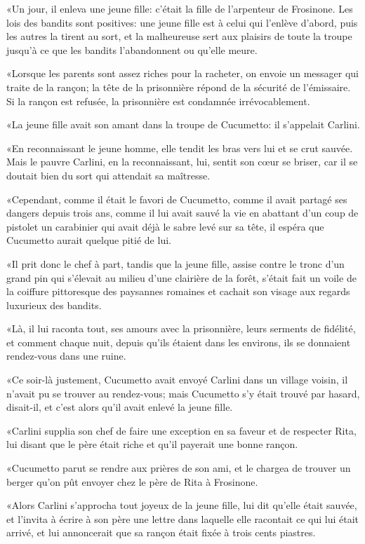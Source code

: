 «Un jour, il enleva une jeune fille: c'était la fille de l'arpenteur de Frosinone. Les lois des bandits sont positives: une jeune fille est à celui qui l'enlève d'abord, puis les autres la tirent au sort, et la malheureuse sert aux plaisirs de toute la troupe jusqu'à ce que les bandits l'abandonnent ou qu'elle meure. 

«Lorsque les parents sont assez riches pour la racheter, on envoie un messager qui traite de la rançon; la tête de la prisonnière répond de la sécurité de l'émissaire. Si la rançon est refusée, la prisonnière est condamnée irrévocablement. 

«La jeune fille avait son amant dans la troupe de Cucumetto: il s'appelait Carlini. 

«En reconnaissant le jeune homme, elle tendit les bras vers lui et se crut sauvée. Mais le pauvre Carlini, en la reconnaissant, lui, sentit son cœur se briser, car il se doutait bien du sort qui attendait sa maîtresse. 

«Cependant, comme il était le favori de Cucumetto, comme il avait partagé ses dangers depuis trois ans, comme il lui avait sauvé la vie en abattant d'un coup de pistolet un carabinier qui avait déjà le sabre levé sur sa tête, il espéra que Cucumetto aurait quelque pitié de lui. 

«Il prit donc le chef à part, tandis que la jeune fille, assise contre le tronc d'un grand pin qui s'élevait au milieu d'une clairière de la forêt, s'était fait un voile de la coiffure pittoresque des paysannes romaines et cachait son visage aux regards luxurieux des bandits. 

«Là, il lui raconta tout, ses amours avec la prisonnière, leurs serments de fidélité, et comment chaque nuit, depuis qu'ils étaient dans les environs, ils se donnaient rendez-vous dans une ruine. 

«Ce soir-là justement, Cucumetto avait envoyé Carlini dans un village voisin, il n'avait pu se trouver au rendez-vous; mais Cucumetto s'y était trouvé par hasard, disait-il, et c'est alors qu'il avait enlevé la jeune fille. 

«Carlini supplia son chef de faire une exception en sa faveur et de respecter Rita, lui disant que le père était riche et qu'il payerait une bonne rançon. 

«Cucumetto parut se rendre aux prières de son ami, et le chargea de trouver un berger qu'on pût envoyer chez le père de Rita à Frosinone. 

«Alors Carlini s'approcha tout joyeux de la jeune fille, lui dit qu'elle était sauvée, et l'invita à écrire à son père une lettre dans laquelle elle racontait ce qui lui était arrivé, et lui annoncerait que sa rançon était fixée à trois cents piastres. 


